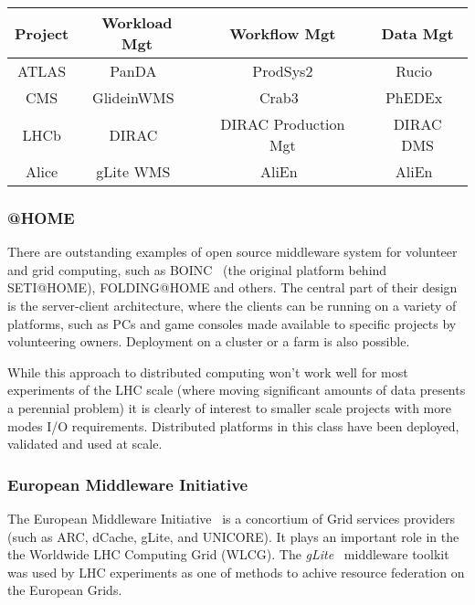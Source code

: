 \begin{center}
  \begin{tabular}{ c | c | c | c }
    \hline
    \textbf{Project} & \textbf{Workload Mgt} & \textbf{Workflow Mgt} & \textbf{Data Mgt}\\ \hline \hline
    ATLAS & PanDA~\cite{panda_chep10} & ProdSys2 & Rucio~\cite{rucio_chep13}\\ \hline
    CMS  & GlideinWMS~\cite{glideinwms} & Crab3~\cite{crab3_chep12} & PhEDEx~\cite{phedex_chep09,phedex_chep10}\\ \hline
    LHCb  & DIRAC~\cite{dirac_acat09}  & DIRAC Production Mgt & DIRAC DMS\\ \hline
    Alice  & gLite WMS~\cite{glite_chep09} & AliEn~\cite{alien_chep07} & AliEn~\cite{alien_chep07}\\ 
    \hline
  \end{tabular}
\end{center}

\subsubsection{@HOME}
\label{at_home}
There are outstanding examples of open source middleware system for volunteer and grid computing, such as BOINC~\cite{boinc} (the original platform behind SETI@HOME),
FOLDING@HOME and others. The central part of their design is the server-client architecture, where the clients can be running on a variety of platforms,
such as PCs and game consoles made available to specific projects by volunteering owners. Deployment on a cluster or a farm is also possible.

While this approach to distributed computing won't work well for most experiments of the LHC scale (where moving significant amounts of data presents a perennial problem)
it is clearly of interest to smaller scale projects with more modes I/O requirements. Distributed platforms in this class have been deployed, validated and used at scale.

\subsubsection{European Middleware Initiative}
The European Middleware Initiative~\cite{emi} is a concortium of Grid services providers (such as ARC, dCache, gLite, and UNICORE).
It plays an important role in the the Worldwide LHC Computing Grid (WLCG). The \textit{gLite}~\cite{glite_chep09} middleware toolkit was used by LHC experiments as one of methods
to achive resource federation on the European Grids. 


